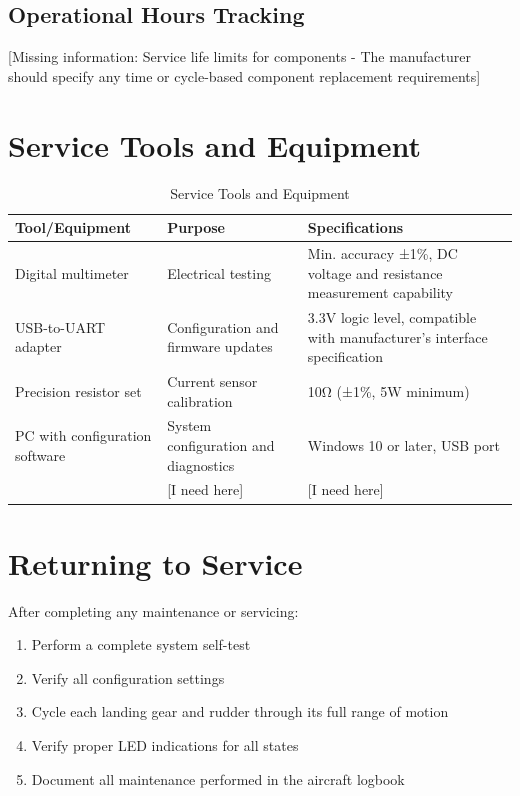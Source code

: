 \documentclass[12pt,a4paper,twoside,openright]{book}
\newcommand{\tabletextfont}{\normalfont\rmfamily}
\newcommand{\tableheadfont}{\normalfont\bfseries}
\begin{document}
\subsection{Operational Hours Tracking}

{\color{missingred}[Missing information: Service life limits for components - The manufacturer should specify any time or cycle-based component replacement requirements]}

\section{Service Tools and Equipment}

\begin{table}[h]
\centering
\setlength{\tabcolsep}{5pt} %
\begin{tabular}{|p{}|p{}|p{}|}
\hline
\tableheadfont\textbf{Tool/Equipment} & \tableheadfont\textbf{Purpose} & \tableheadfont\textbf{Specifications} \\
\hline
\tabletextfont Digital multimeter & Electrical testing & Min. accuracy ±1\%, DC voltage and resistance measurement capability \\
\hline
\tabletextfont USB-to-UART adapter & Configuration and firmware updates & 3.3V logic level, compatible with manufacturer's interface specification \\
\hline
\tabletextfont Precision resistor set & Current sensor calibration & 10Ω (±1\%, 5W minimum) \\
\hline
\tabletextfont PC with configuration software & System configuration and diagnostics & Windows 10 or later, USB port \\
\hline
\tabletextfont {\color{missingred}[I need here]} & {\color{missingred}[I need here]} & {\color{missingred}[I need here]} \\
\hline
\end{tabular}
\caption{Service Tools and Equipment}
\end{table}

\section{Returning to Service}

After completing any maintenance or servicing:

\begin{enumerate}
    \item Perform a complete system self-test
    \item Verify all configuration settings
    \item Cycle each landing gear and rudder through its full range of motion
    \item Verify proper LED indications for all states
    \item Document all maintenance performed in the aircraft logbook
\end{enumerate}
\end{document}
